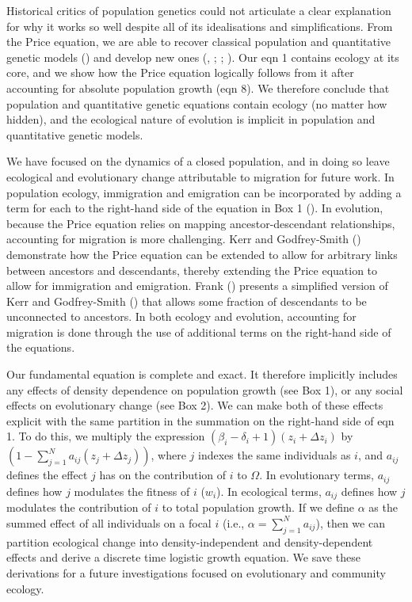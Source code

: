 \documentclass[
]{article}
\begin{document}
Historical critics of population genetics could not articulate a clear
explanation for why it works so well despite all of its idealisations
and simplifications. From the Price equation, we are able to recover
classical population and quantitative genetic models
() and develop new ones
(, ;
; ). Our eqn 1 contains ecology at its core, and we show how the
Price equation logically follows from it after accounting for absolute
population growth (eqn 8). We therefore conclude that population and
quantitative genetic equations contain ecology (no matter how hidden),
and the ecological nature of evolution is implicit in population and
quantitative genetic models.

We have focused on the dynamics of a closed population, and in doing so
leave ecological and evolutionary change attributable to migration for
future work. In population ecology, immigration and emigration can be
incorporated by adding a term for each to the right-hand side of the
equation in Box 1 (). In
evolution, because the Price equation relies on mapping
ancestor-descendant relationships, accounting for migration is more
challenging. Kerr and Godfrey-Smith ()
demonstrate how the Price equation can be extended to allow for
arbitrary links between ancestors and descendants, thereby extending the
Price equation to allow for immigration and emigration. Frank
() presents a simplified version of Kerr
and Godfrey-Smith () that allows some
fraction of descendants to be unconnected to ancestors. In both ecology
and evolution, accounting for migration is done through the use of
additional terms on the right-hand side of the equations.

Our fundamental equation is complete and exact. It therefore implicitly
includes any effects of density dependence on population growth (see Box
1), or any social effects on evolutionary change (see Box 2). We can
make both of these effects explicit with the same partition in the
summation on the right-hand side of eqn 1. To do this, we multiply the
expression
\(\left(\beta_{i} - \delta_{i} + 1 \right)\left(z_{i} + \Delta z_{i} \right)\)
by
\(\left(1 - \sum_{j=1}^{N} a_{ij}\left(z_{j} + \Delta z_{j}\right)\right)\),
where \(j\) indexes the same individuals as \(i\), and \(a_{ij}\)
defines the effect \(j\) has on the contribution of \(i\) to \(\Omega\).
In evolutionary terms, \(a_{ij}\) defines how \(j\) modulates the
fitness of \(i\) (\(w_{i}\)). In ecological terms, \(a_{ij}\) defines
how \(j\) modulates the contribution of \(i\) to total population
growth. If we define \(\alpha\) as the summed effect of all individuals
on a focal \(i\) (i.e., \(\alpha = \sum_{j=1}^{N} a_{ij}\)), then we can
partition ecological change into density-independent and
density-dependent effects and derive a discrete time logistic growth
equation. We save these derivations for a future investigations focused
on evolutionary and community ecology.
\end{document}
